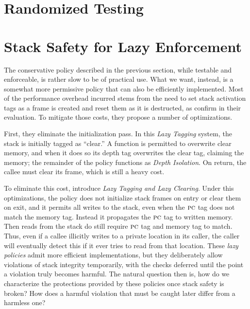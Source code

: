 \documentclass[acmsmall,review,anonymous]{acmart}\settopmatter{printfolios=true,printccs=false,printacmref=false}
\begin{document}

\section{Randomized Testing}
\label{sec:testing}

\section{Stack Safety for Lazy Enforcement}
\label{sec:lazy}

The conservative policy described in the previous section, while
testable and enforceable, is rather slow to be of practical use. What
we want, instead, is a somewhat more permissive policy that can also
be efficiently implemented. Most of the performance overhead incurred
stems from the need to set stack activation tags as a frame is created
and reset them as it is destructed, as
\citet{DBLP:conf/sp/RoesslerD18} confirm in their evaluation. To
mitigate those costs, they propose a number of optimizations.

First, they eliminate the initialization pass. In this {\em Lazy Tagging}
system, the stack is initially tagged as ``clear.'' A function is permitted
to overwrite clear memory, and when it does so its depth tag overwrites
the clear tag, claiming the memory; the remainder of the policy functions
as {\em Depth Isolation}. On return, the callee must clear its frame, which
is still a heavy cost.

To eliminate this cost, \citet{DBLP:conf/sp/RoesslerD18} introduce
{\em Lazy Tagging and Lazy Clearing}. Under this optimizations,
the policy does not initialize stack frames on entry or clear them on exit,
and it permits all writes to the stack, even when the $\textsc{pc}$ tag
does not match the memory tag. Instead it propagates the \(\textsc{pc}\) tag
to written memory. Then reads from the stack do still require $\textsc{pc}$
tag and memory tag to match. Thus, even if a callee illicitly writes to
a private location in its caller, the caller will eventually detect this
if it ever tries to read from that location.
%
These \emph{lazy policies} admit more efficient implementations, but
they deliberately allow violations of stack integrity temporarily,
with the checks deferred until the point a violation truly becomes
harmful. The natural question then is, how do we characterize the
protections provided by these policies once stack safety is broken?
How does a harmful violation that must be caught later differ from a
harmless one?
\end{document}
